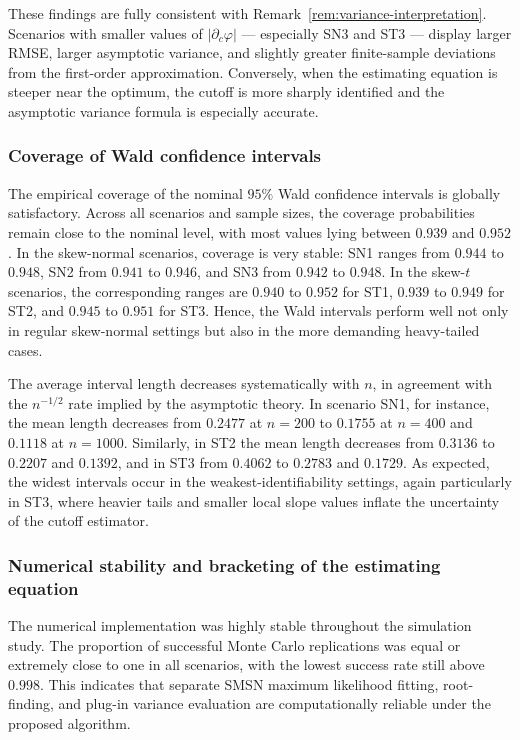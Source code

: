 \documentclass[11pt,a4paper]{article}
\theoremstyle{definition}
\theoremstyle{remark}
\newcommand{\1}{\mathbf{1}}
\begin{document}
These findings are fully consistent with
Remark~\ref{rem:variance-interpretation}. Scenarios with smaller values
of $|\partial_c\varphi|$ --- especially SN3 and ST3 --- display larger
RMSE, larger asymptotic variance, and slightly greater finite-sample
deviations from the first-order approximation. Conversely, when the estimating equation is steeper near the optimum, the cutoff is more
sharply identified and the asymptotic variance formula is especially
accurate.

\subsubsection{Coverage of Wald confidence intervals}

The empirical coverage of the nominal $95\%$ Wald confidence intervals is
globally satisfactory. Across all scenarios and sample sizes, the
coverage probabilities remain close to the nominal level, with most
values lying between $0.939$ and $0.952$. In the skew-normal scenarios,
coverage is very stable: SN1 ranges from $0.944$ to $0.948$, SN2 from
$0.941$ to $0.946$, and SN3 from $0.942$ to $0.948$. In the skew-$t$
scenarios, the corresponding ranges are $0.940$ to $0.952$ for ST1,
$0.939$ to $0.949$ for ST2, and $0.945$ to $0.951$ for ST3. Hence, the
Wald intervals perform well not only in regular skew-normal settings
but also in the more demanding heavy-tailed cases.

The average interval length decreases systematically with $n$, in
agreement with the $n^{-1/2}$ rate implied by the asymptotic theory. In
scenario SN1, for instance, the mean length decreases from $0.2477$ at
$n=200$ to $0.1755$ at $n=400$ and $0.1118$ at $n=1000$. Similarly, in
ST2 the mean length decreases from $0.3136$ to $0.2207$ and $0.1392$,
and in ST3 from $0.4062$ to $0.2783$ and $0.1729$. As expected, the
widest intervals occur in the weakest-identifiability settings, again
particularly in ST3, where heavier tails and smaller local slope values
inflate the uncertainty of the cutoff estimator.

\subsubsection{Numerical stability and bracketing of the estimating equation}

The numerical implementation was highly stable throughout the
simulation study. The proportion of successful Monte Carlo replications
was equal or extremely close to one in all scenarios, with the lowest
success rate still above $0.998$. This indicates that separate SMSN
maximum likelihood fitting, root-finding, and plug-in variance
evaluation are computationally reliable under the proposed algorithm.
\end{document}
